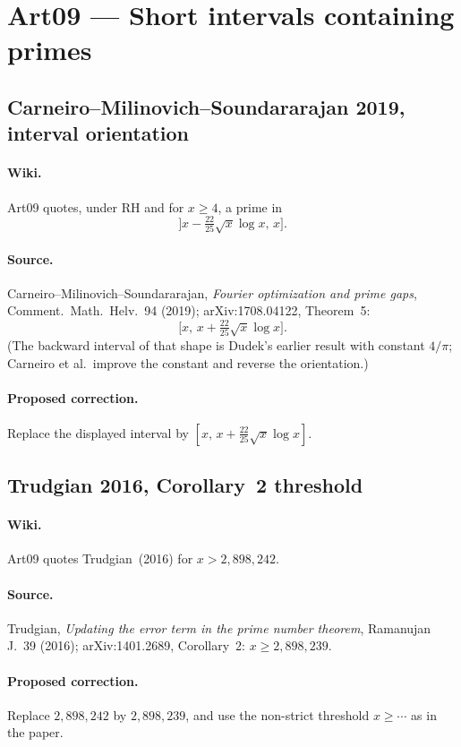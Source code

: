 \documentclass[11pt,a4paper]{article}
\begin{document}
\section{Art09 --- Short intervals containing primes}

\subsection{Carneiro--Milinovich--Soundararajan 2019, interval orientation}
\label{err:cms-orientation}
\paragraph{Wiki.}
Art09 quotes, under RH and for $x\ge4$, a prime in
\[
\bigl]x-\tfrac{22}{25}\sqrt{x}\log x,\,x\bigr].
\]
\paragraph{Source.}
Carneiro--Milinovich--Soundararajan, \emph{Fourier optimization and prime
gaps}, Comment.\ Math.\ Helv.\ 94 (2019); arXiv:1708.04122, Theorem~5:
\[
\bigl[x,\,x+\tfrac{22}{25}\sqrt{x}\log x\bigr].
\]
(The backward interval of that shape is Dudek's earlier result with
constant $4/\pi$; Carneiro et al.\ improve the constant and reverse the
orientation.)
\paragraph{Proposed correction.}
Replace the displayed interval by
$[x,\,x+\tfrac{22}{25}\sqrt{x}\log x]$.

\subsection{Trudgian 2016, Corollary~2 threshold}
\label{err:trudgian-cor2}
\paragraph{Wiki.}
Art09 quotes Trudgian~(2016) for $x>2{,}898{,}242$.
\paragraph{Source.}
Trudgian, \emph{Updating the error term in the prime number theorem},
Ramanujan J.\ 39 (2016); arXiv:1401.2689, Corollary~2: $x\ge 2{,}898{,}239$.
\paragraph{Proposed correction.}
Replace $2{,}898{,}242$ by $2{,}898{,}239$, and use the non-strict
threshold $x\ge\cdots$ as in the paper.
\end{document}
